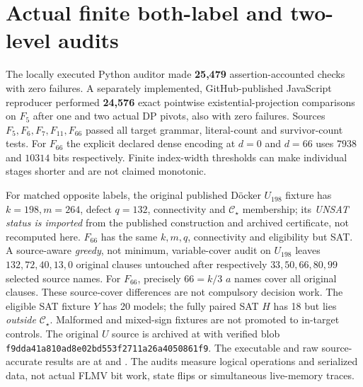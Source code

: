 \documentclass[11pt]{article}
\newcommand{\CS}{\mathcal C_\star}
\begin{document}
\section{Actual finite both-label and two-level audits}
The locally executed Python auditor made \textbf{25,479}
assertion-accounted checks with zero failures.
A separately implemented, GitHub-published JavaScript reproducer
performed \textbf{24,576} exact pointwise
existential-projection comparisons on $F_5$ after one and two
actual DP pivots, also with zero failures.
Sources $F_5,F_6,F_7,F_{11},F_{66}$ passed
all target grammar, literal-count and survivor-count tests.
For $F_{66}$ the explicit declared dense encoding at
$d=0$ and $d=66$ uses $7938$ and $10314$ bits respectively.
Finite index-width thresholds can make individual stages
shorter and are not claimed monotonic.

For matched opposite labels, the original published
D\"ocker $U_{198}$ fixture has $k=198,m=264$,
defect $q=132$, connectivity and $\CS$ membership;
its \emph{UNSAT status is imported} from the published
construction and archived certificate, not recomputed here.
$F_{66}$ has the same $k,m,q$, connectivity and eligibility
but SAT. A source-aware \emph{greedy}, not minimum,
variable-cover audit on $U_{198}$ leaves $132,72,40,13,0$
original clauses untouched after respectively
$33,50,66,80,99$ selected source names.
For $F_{66}$, precisely $66=k/3$ $a$ names cover
all original clauses. These source-cover differences
are not compulsory decision work. The eligible SAT fixture
$Y$ has 20 models; the fully paired SAT $H$ has 18
but lies \emph{outside} $\CS$.
Malformed and mixed-sign fixtures are not promoted
to in-target controls.
The original $U$ source is archived at
with verified blob \texttt{f9dda41a810ad8e02bd553f2711a26a4050861f9}.
The executable and raw source-accurate results are at
and .
The audits measure logical operations and serialized data, not actual
FLMV bit work, state flips or simultaneous live-memory traces.
\end{document}
